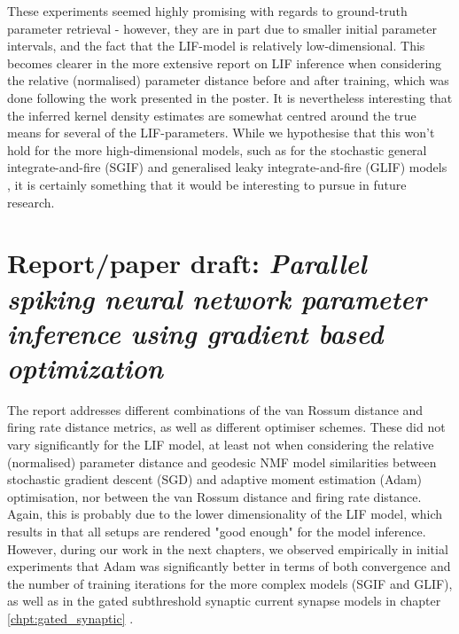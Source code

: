 \documentclass[mphil,deptreport,ianc]{infthesis} %
\begin{document}
These experiments seemed highly promising with regards to ground-truth parameter retrieval - however, they are in part due to smaller initial parameter intervals, and the fact that the LIF-model is relatively low-dimensional.
This becomes clearer in the more extensive report on LIF inference when considering the relative (normalised) parameter distance before and after training, which was done following the work presented in the poster.
It is nevertheless interesting that the inferred kernel density estimates are somewhat centred around the true means for several of the LIF-parameters.
While we hypothesise that this won't hold for the more high-dimensional models, such as for the stochastic general integrate-and-fire (SGIF) \cite{Rene2020} and generalised leaky integrate-and-fire (GLIF) models \cite{allen_glif_white_paper}, it is certainly something that it would be interesting to pursue in future research.



\section{Report/paper draft: \textit{Parallel spiking neural network parameter inference using gradient based optimization}}

The report addresses different combinations of the van Rossum distance and firing rate distance metrics, as well as different optimiser schemes.
These did not vary significantly for the LIF model, at least not when considering the relative (normalised) parameter distance and geodesic NMF model similarities between stochastic gradient descent (SGD) and adaptive moment estimation (Adam) optimisation, nor between the van Rossum distance and firing rate distance.
Again, this is probably due to the lower dimensionality of the LIF model, which results in that all setups are rendered "good enough" for the model inference.
However, during our work in the next chapters, we observed empirically in initial experiments that Adam was significantly better in terms of both convergence and the number of training iterations for the more complex models (SGIF and GLIF), as well as in the gated subthreshold synaptic current synapse models in chapter \ref{chpt:gated_synaptic} \cite{Huh2017}.


\end{document}
